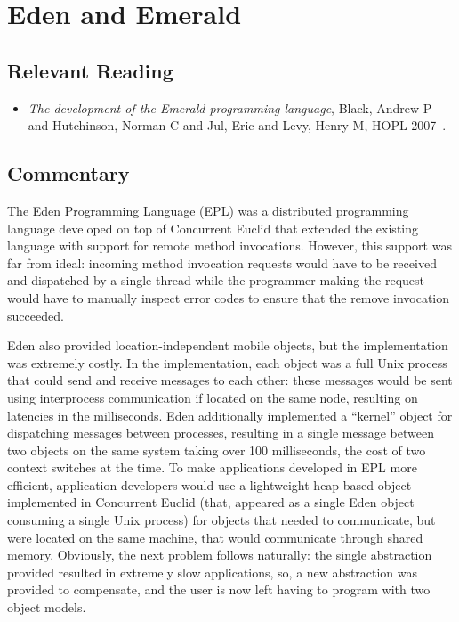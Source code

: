 \section{Eden and Emerald}

\subsection{Relevant Reading}

\begin{itemize}
	\item \textit{The development of the Emerald programming language}, Black, Andrew P and Hutchinson, Norman C and Jul, Eric and Levy, Henry M, HOPL 2007~\cite{black2007development}.
\end{itemize}

\subsection{Commentary}

The Eden Programming Language (EPL) was a distributed programming language developed on top of Concurrent Euclid that extended the existing language with support for remote method invocations.  However, this support was far from ideal: incoming method invocation requests would have to be received and dispatched by a single thread while the programmer making the request would have to manually inspect error codes to ensure that the remove invocation succeeded.

Eden also provided location-independent mobile objects, but the implementation was extremely costly.  In the implementation, each object was a full Unix process that could send and receive messages to each other: these messages would be sent using interprocess communication if located on the same node, resulting on latencies in the milliseconds.  Eden additionally implemented a ``kernel'' object for dispatching messages between processes, resulting in a single message between two objects on the same system taking over 100 milliseconds, the cost of two context switches at the time.  To make applications developed in EPL more efficient, application developers would use a lightweight heap-based object implemented in Concurrent Euclid (that, appeared as a single Eden object consuming a single Unix process) for objects that needed to communicate, but were located on the same machine, that would communicate through shared memory.  Obviously, the next problem follows naturally: the single abstraction provided resulted in extremely slow applications, so, a new abstraction was provided to compensate, and the user is now left having to program with two object models.

